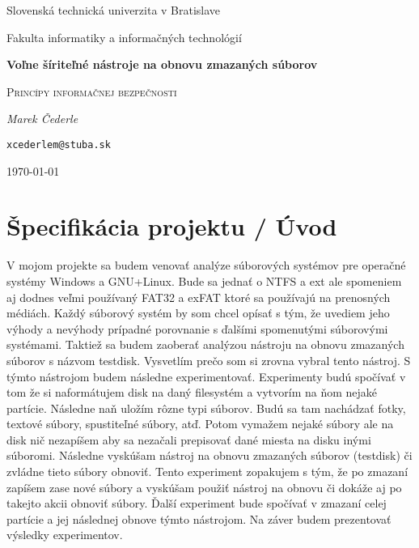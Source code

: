 \documentclass[12pt,oneside,slovak,a4paper]{article}
\begin{document}

\begin{titlepage}
	\centering
    {\Large Slovenská technická univerzita v Bratislave\par}
    {\Large Fakulta informatiky a informačných technológií\par}
	\vspace{7cm}
	{\huge\bfseries Voľne šíriteľné nástroje na obnovu zmazaných súborov\par}
	\vspace{0.5cm}
    {\Large \textsc{Princípy informačnej bezpečnosti}\par}
    \vspace{1cm}
	{\Large\itshape Marek Čederle\par}
    {\small\texttt{xcederlem@stuba.sk}\par}
	\vfill

	{\large \today\par}
\end{titlepage}


\tableofcontents
\vspace*{\fill}

\section{Špecifikácia projektu / Úvod}
V mojom projekte sa budem venovať analýze súborových systémov pre operačné systémy Windows a GNU+Linux. Bude sa jednať o NTFS a ext ale spomeniem aj dodnes veľmi používaný FAT32 a exFAT ktoré sa používajú na prenosných médiách. Každý súborový systém by som chcel opísať s tým, že uvediem jeho výhody a nevýhody prípadné porovnanie s ďalšími spomenutými súborovými systémami. Taktiež sa budem zaoberať analýzou nástroju na obnovu zmazaných súborov s názvom testdisk. Vysvetlím prečo som si zrovna vybral tento nástroj. S týmto nástrojom budem následne experimentovať. Experimenty budú spočívať v tom že si naformátujem disk na daný filesystém a vytvorím na ňom nejaké partície. Následne naň uložím rôzne typi súborov. Budú sa tam nachádzať fotky, textové súbory, spustiteľné súbory, atď. Potom vymažem nejaké súbory ale na disk nič nezapíšem aby sa nezačali prepisovať dané miesta na disku inými súboromi. Následne vyskúšam nástroj na obnovu zmazaných súborov (testdisk) či zvládne tieto súbory obnoviť. Tento experiment zopakujem s tým, že po zmazaní zapíšem zase nové súbory a vyskúšam použiť nástroj na obnovu či dokáže aj po takejto akcii obnoviť súbory. Ďalší experiment bude spočívať v zmazaní celej partície a jej následnej obnove týmto nástrojom. Na záver budem prezentovať výsledky experimentov.
\end{document}
